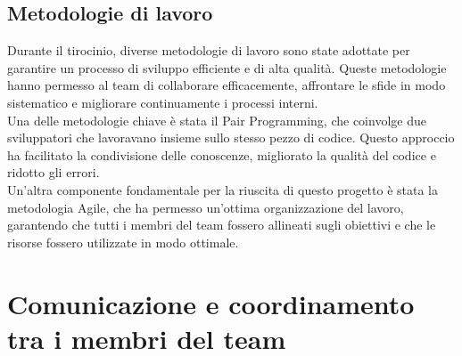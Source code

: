 \subsection{Metodologie di lavoro}
\label{sub:metodologie_lavoro}

Durante il tirocinio, diverse metodologie di lavoro sono state adottate per garantire
un processo di sviluppo efficiente e di alta qualità. Queste metodologie hanno
permesso al team di collaborare efficacemente, affrontare le sfide in modo sistematico
e migliorare continuamente i processi interni.\\ Una delle metodologie chiave è stata
il Pair Programming, che coinvolge due sviluppatori che lavoravano insieme sullo
stesso pezzo di codice. Questo approccio ha facilitato la condivisione delle conoscenze,
migliorato la qualità del codice e ridotto gli errori.\\ Un'altra componente
fondamentale per la riuscita di questo progetto è stata la metodologia Agile, che
ha permesso un'ottima organizzazione del lavoro, garantendo che tutti i membri
del team fossero allineati sugli obiettivi e che le risorse fossero utilizzate
in modo ottimale.

\section{Comunicazione e coordinamento tra i membri del team}
\label{sec:coordinamento}

